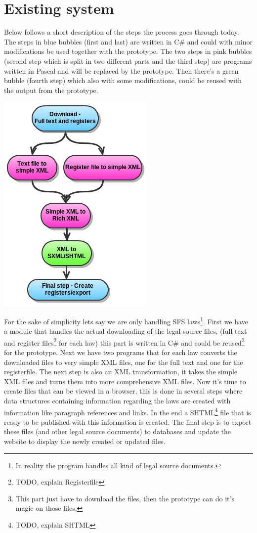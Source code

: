 \documentclass[a4paper,11pt]{kth-mag}
\begin{document}
\section{Existing system}

Below follows a short description of the steps the process goes through today. The steps in blue bubbles (first and last) are written in C\# and could with minor modifications be used together with the prototype. The two steps in pink bubbles (second step which is split in two different parts and the third step) are programs written in Pascal and will be replaced by the prototype. Then there's a green bubble (fourth step) which also with some modifications, could be reused with the output from the prototype.   
\begin{center}
\includegraphics[scale=0.6]{imgs/oldSystemChart.png}
\end{center}
For the sake of simplicity lets say we are only handling SFS laws\footnote{In reality the program handles all kind of legal source documents.}. First we have a module that handles the actual downloading of the legal source files, (full text and register files\footnote{TODO, explain Registerfile} for each law) this part is written in C\# and could be reused\footnote{This part just have to download the files, then the prototype can do it's magic on those files.} for the prototype. Next we have two programs that for each law converts the downloaded files to very simple XML files, one for the full text and one for the registerfile. The next step is also an XML transformation, it takes the simple XML files and turns them into more comprehensive XML files. Now it's time to create files that can be viewed in a browser, this is done in several steps where data structures containing information regarding the laws are created with information like paragraph references and links. In the end a SHTML\footnote{TODO, explain SHTML} file that is ready to be published with this information is created. The final step is to export these files (and other legal source documents) to databases and update the website to display the newly created or updated files. 
\end{document}
